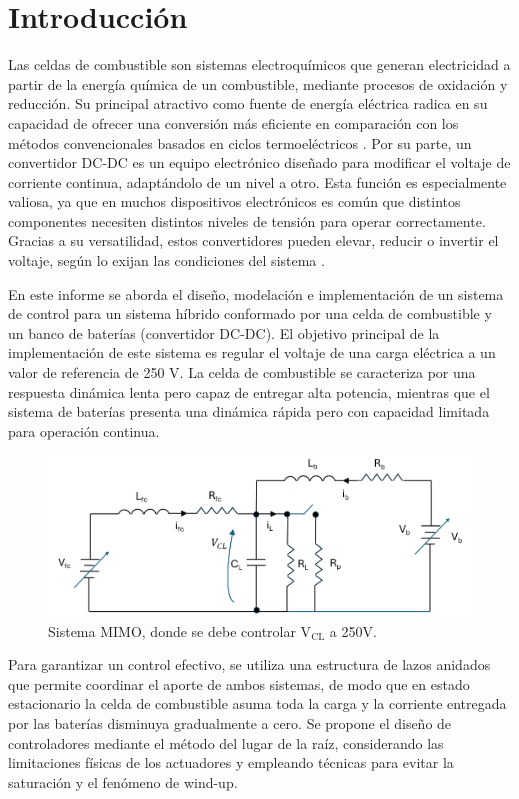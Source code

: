 \section{Introducción}
Las celdas de combustible son sistemas electroquímicos que generan electricidad a partir de la energía química de un combustible, 
mediante procesos de oxidación y reducción. Su principal atractivo como fuente de energía eléctrica radica en su capacidad de 
ofrecer una conversión más eficiente en comparación con los métodos convencionales basados en ciclos termoeléctricos \cite{cec}. 
Por su parte, un convertidor DC-DC es un equipo electrónico diseñado para modificar el voltaje de corriente 
continua, adaptándolo de un nivel a otro. Esta función es especialmente valiosa, ya que en muchos dispositivos 
electrónicos es común que distintos componentes necesiten distintos niveles de tensión para operar correctamente. Gracias a su versatilidad, 
estos convertidores pueden elevar, reducir o invertir el voltaje, según lo exijan las condiciones del sistema \cite{juanito}.

En este informe se aborda el diseño, modelación e implementación de un sistema de control para un sistema híbrido 
conformado por una celda de combustible y un banco de baterías (convertidor DC-DC). El objetivo principal 
de la implementación de este sistema es regular el voltaje de una carga eléctrica a un valor de referencia de 
250 V. La celda de combustible se caracteriza por una respuesta dinámica lenta pero capaz de entregar alta potencia,
mientras que el sistema de baterías presenta una dinámica rápida pero con capacidad limitada para operación continua.

\begin{figure}
    \centering
    \includegraphics[width=0.7\linewidth]{img/circuito.png}
    \caption{Sistema MIMO, donde se debe controlar V$_{\text{CL}}$ a 250V.}
    \label{fig:circuito}
\end{figure}

Para garantizar un control efectivo, se utiliza una estructura de lazos anidados que permite coordinar el aporte de ambos 
sistemas, de modo que en estado estacionario la celda de combustible asuma toda la carga y la corriente entregada 
por las baterías disminuya gradualmente a cero. Se propone el diseño de controladores mediante el método del lugar de 
la raíz, considerando las limitaciones físicas de los actuadores y empleando técnicas para evitar la saturación y el fenómeno de wind-up.

